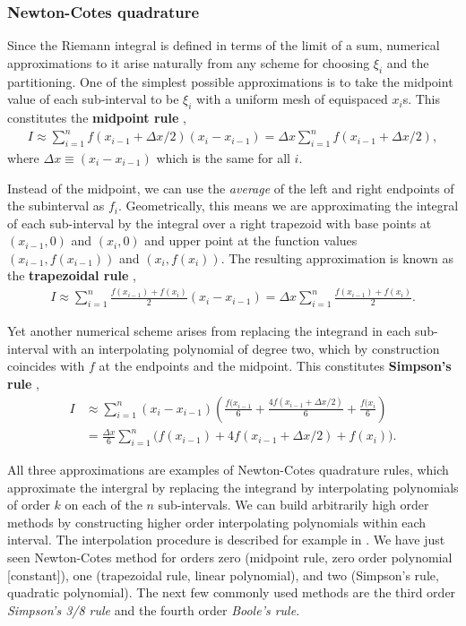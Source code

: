 \documentclass[a4paper]{article}
\newcommand{\nn}{\nonumber}
\newcommand{\comment}[1]{\ignorespaces}
\begin{document}
\subsubsection{Newton-Cotes quadrature}
Since the Riemann integral is defined in terms of the limit of a sum, numerical approximations to it arise naturally from any scheme for choosing $\xi_i$ and the partitioning. One of the simplest possible approximations is to take the midpoint value of each sub-interval to be $\xi_i$ with a uniform mesh of equispaced $x_i$s. This constitutes the {\bf midpoint rule} \cite{davis}\comment{p52}, 
\begin{align}
I\approx \sum_{i=1}^n f(x_{i-1}+\Delta x/2)(x_{i}-x_{i-1})=\Delta x\sum_{i=1}^n f(x_{i-1}+\Delta x/2),
\end{align}
where $\Delta x\equiv (x_i-x_{i-1})$ which is the same for all $i$.

Instead of the midpoint, we can use the \emph{average} of the left and right endpoints of the subinterval as $f_i$. Geometrically, this means we are approximating the integral of each sub-interval by the integral over a right trapezoid with base points at $(x_{i-1},0)$ and $(x_i,0)$ and upper point at the function values $(x_{i-1},f(x_{i-1}))$ and $(x_{i},f(x_{i}))$. The resulting approximation is known as the {\bf trapezoidal rule} \cite{hjorthjensen}\comment{p113},
\begin{align}
I\approx \sum_{i=1}^n \frac{f(x_{i-1})+f(x_{i})}{2}(x_i-x_{i-1}) = \Delta x \sum_{i=1}^n \frac{f(x_{i-1})+f(x_{i})}{2}.
\end{align}

Yet another numerical scheme arises from replacing the integrand in each sub-interval with an interpolating polynomial of degree two, which by construction coincides with $f$ at the endpoints and the midpoint. This constitutes {\bf Simpson's rule} \cite{davis}\comment{p57},
\begin{align}
I&\approx \sum_{i=1}^n (x_i-x_{i-1})\left(\frac{f(x_{i-1}}{6}+\frac{4f(x_{i-1}+\Delta x/2)}{6}+\frac{f(x_{i}}{6}\right) \nn\\
&= \frac{\Delta x}{6}\sum_{i=1}^n \Big( f(x_{i-1}) + 4f(x_{i-1}+\Delta x/2) + f(x_i) \Big).
\end{align}

All three approximations are examples of Newton-Cotes quadrature rules, which approximate the intergral by replacing the integrand by interpolating polynomials of order $k$ on each of the $n$ sub-intervals. We can build arbitrarily high order methods by constructing higher order interpolating polynomials within each interval. The interpolation procedure is described for example in \cite{morken}. We have just seen Newton-Cotes method for orders zero (midpoint rule, zero order polynomial [constant]), one (trapezoidal rule, linear polynomial), and two (Simpson's rule, quadratic polynomial). The next few commonly used methods are the third order \emph{Simpson's 3/8 rule} and the fourth order \emph{Boole's rule}.
\end{document}
